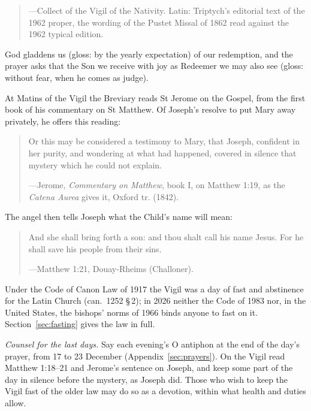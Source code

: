 \begin{quote}
\par
{\smallskip\noindent\small ---Collect of the Vigil of the Nativity. Latin: Triptych's editorial
text of the 1962 proper, the wording of the Pustet Missal of 1862 read against the 1962 typical
edition.\par}
\end{quote}

\noindent God gladdens us  (gloss: by the yearly expectation) of our
redemption, and the prayer asks that the Son we receive with joy as Redeemer we may also see
 (gloss: without fear, when he comes as judge).

At Matins of the Vigil the Breviary reads St Jerome on the Gospel, from the first book of his
commentary on St Matthew. Of Joseph's resolve to put Mary away privately, he offers this reading:

\begin{quote}
Or this may be considered a testimony to Mary, that Joseph, confident in her purity, and
wondering at what had happened, covered in silence that mystery which he could not explain.\par
{\smallskip\noindent\small ---Jerome, \textit{Commentary on Matthew}, book I, on Matthew 1:19,
as the \textit{Catena Aurea} gives it, Oxford tr. (1842).\par}
\end{quote}

\noindent The angel then tells Joseph what the Child's name will mean:

\begin{quote}
And she shall bring forth a son: and thou shalt call his name Jesus. For he shall save his people
from their sins.\par
{\smallskip\noindent\small ---Matthew 1:21, Douay-Rheims (Challoner).\par}
\end{quote}

Under the Code of Canon Law of 1917 the Vigil was a day of fast and abstinence for the Latin
Church (can.~1252 \S\,2); in 2026 neither the Code of 1983 nor, in the United States, the bishops'
norms of 1966 binds anyone to fast on it. Section~\ref{sec:fasting} gives the law in full.

\medskip
\noindent\textit{Counsel for the last days.} Say each evening's O antiphon at the end of the day's
prayer, from 17 to 23 December (Appendix~\ref{sec:prayers}). On the Vigil read Matthew 1:18--21
and Jerome's sentence on Joseph, and keep some part of the day in silence before the mystery, as
Joseph did. Those who wish to keep the Vigil fast of the older law may do so as a devotion, within
what health and duties allow.
